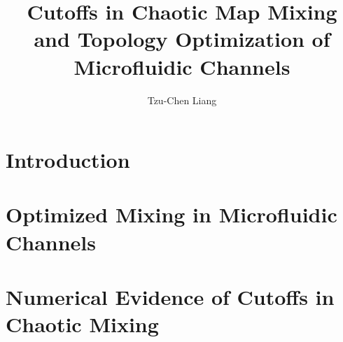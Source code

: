 \documentclass[twoside,10pt,final]{report}
\begin{document}
    \title{Cutoffs in Chaotic Map Mixing and Topology Optimization of Microfluidic Channels}
    \author{Tzu-Chen Liang}
    \tablespagefalse
    
    
    \beforepreface
     


    \newpage


      

    \afterpreface


 








\chapter{Introduction}



\chapter{Optimized Mixing in Microfluidic Channels}





\chapter[Numerical Evidence of Cutoffs]{Numerical Evidence of Cutoffs in Chaotic Mixing}



\end{document}
